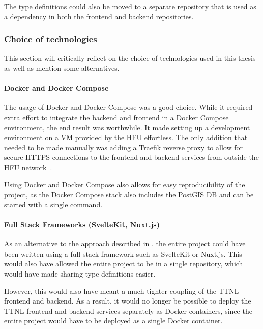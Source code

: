 The type definitions could also be moved to a separate repository that is used as a dependency in both the frontend and backend repositories.

\subsubsection{Choice of technologies}

This section will critically reflect on the choice of technologies used in this thesis as well as mention some alternatives.

\paragraph{Docker and Docker Compose}

The usage of Docker and Docker Compose was a good choice.
While it required extra effort to integrate the backend and frontend in a Docker Compose environment, the end result was worthwhile.
It made setting up a development environment on a \ac{VM} provided by the \ac{HFU} effortless.
The only addition that needed to be made manually was adding a Traefik reverse proxy to allow for secure \ac{HTTPS} connections to the frontend and backend services from outside the \ac{HFU} network~\cite{traefik_labs_traefik_2023}.

Using Docker and Docker Compose also allows for easy reproducibility of the project, as the Docker Compose stack also includes the PostGIS \ac{DB} and can be started with a single command.

\paragraph{Full Stack Frameworks (SvelteKit, Nuxt.js)}

As an alternative to the approach described in , the entire project could have been written using a full-stack framework such as SvelteKit or Nuxt.js.
This would also have allowed the entire project to be in a single repository, which would have made sharing type definitions easier.

However, this would also have meant a much tighter coupling of the \ac{TTNL} frontend and backend.
As a result, it would no longer be possible to deploy the \ac{TTNL} frontend and backend services separately as Docker containers, since the entire project would have to be deployed as a single Docker container.

